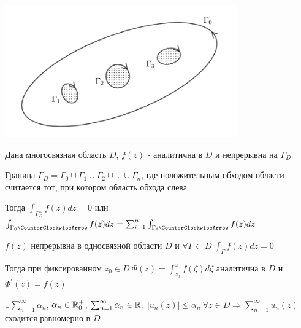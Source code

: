 \documentclass[12pt]{article}
\begin{document}
\begin{MyTheorem}
    
    \begin{center}
        \includegraphics[width=10cm]{addchapters2/images/addchapters2_2025_04_04_2}
    \end{center}
    
     Дана многосвязная область $D$, $f(z)$ - аналитична в $D$ и непрерывна на $\Gamma_D$


    Граница $\Gamma_D = \Gamma_0 \cup \Gamma_1 \cup \Gamma_2 \cup \dots \cup \Gamma_n$, где положительным обходом области
    считается тот, при котором область обхода слева

    Тогда $\int_{\Gamma_D^+} f(z) dz = 0$ или $\int_{\Gamma_0 \CounterClockwiseArrow} f(z) dz = \sum_{i = 1}^n \int_{\Gamma_i \CounterClockwiseArrow} f(z) dz$ 
\end{MyTheorem}

\begin{MyTheorem}
    \Ths $f(z)$ непрерывна в односвязной области $D$ и $\forall \Gamma \subset D \ \int_\Gamma f(z) dz = 0$

    Тогда при фиксированном $z_0 \in D \ \Phi(z) = \int_{z_0}^z f(\zeta) d\zeta$ аналитична в $D$ и $\Phi^\prime(z) = f(z)$
\end{MyTheorem}

\begin{MyTheorem}

    $\exists \sum_{n = 1}^\infty \alpha_n$, $\alpha_n \in \mathbb{R}_0^+$, $\sum_{n = 1}^\infty \alpha_n \in \mathbb{R}$,
    $|u_n(z)| \leq \alpha_n \ \forall z \in D \Longrightarrow \sum_{n = 1}^\infty u_n(z)$ сходится равномерно в $D$
\end{MyTheorem}
\end{document}
